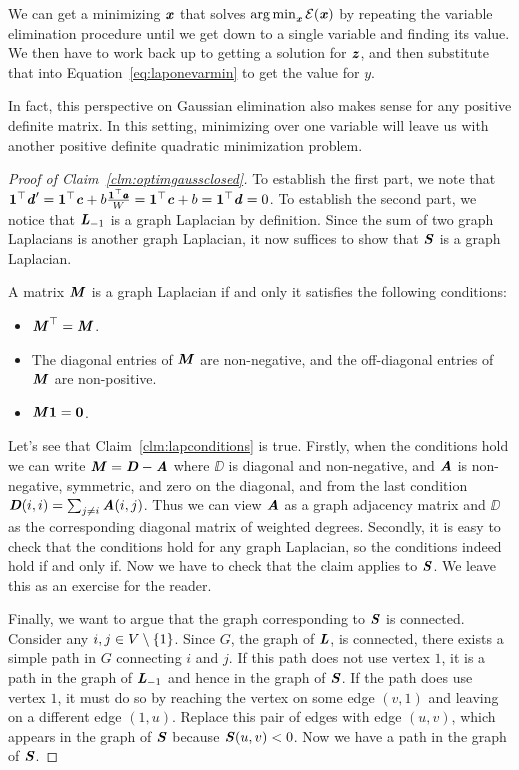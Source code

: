We can get a minimizing $\xx$ that solves $\argmin_{\xx}
    \energy(\xx)$ by repeating the variable elimination procedure until we get
down to a single variable and finding its value.
We then have to work back up to getting a solution for $\zz$, and then
substitute that into Equation~\eqref{eq:laponevarmin} to get the value
for $y$.
\begin{remark}
  In fact, this perspective on Gaussian elimination also makes sense for any
  positive definite matrix.
  In this setting, minimizing over one variable will leave us with
  another positive definite quadratic minimization problem.
\end{remark}


% 
\begin{proof}[Proof of Claim~\ref{clm:optimgaussclosed}]
To establish the first part, we note that  $\vecone^\trp \dd' = \vecone^\trp \cc + b\frac{\vecone^\trp\aa}{W} =
\vecone^\trp \cc + b= \vecone^\trp \dd = 0$.
To establish the second part, we notice that $\LL_{-1}$ is a graph
Laplacian by definition.
Since the sum of two graph Laplacians is another graph Laplacian, it
now suffices to show that $\SS $ is a graph Laplacian.
\begin{claim}
\label{clm:lapconditions}
  A matrix $\MM$ is a graph Laplacian if and only it satisfies the following conditions:
  \begin{itemize}
  \item  $\MM^\trp = \MM$.
  \item The diagonal entries of $\MM$ are non-negative, and the
    off-diagonal entries of $\MM$ are non-positive.
  \item $\MM \vecone = \veczero$.
  \end{itemize}
\end{claim}
Let's see that Claim~\ref{clm:lapconditions} is true. Firstly, when the conditions hold we
can write $\MM = \DD - \AA$ where $\DD$ is diagonal and non-negative,
and $\AA$ is non-negative, symmetric, and zero on the diagonal, and from the last condition
$\DD(i,i) = \sum_{j \neq i} \AA(i,j)$.
Thus we can view $\AA$ as a graph adjacency matrix and $\DD$ as the
corresponding diagonal matrix of weighted degrees.
Secondly, it is easy to check that the conditions hold for any graph
Laplacian, so the conditions indeed hold if and only if.
Now we have to check that the claim applies to $\SS$. We leave
this as an exercise for the reader.

Finally, we want to argue that the graph corresponding to $\SS$ is
connected.
Consider any $i,j \in V\setminus\setof{1}$.
Since $G$, the graph of $\LL$, is connected, there exists a simple path in
$G$ connecting $i$ and $j$.
If this path does not use vertex $1$, it is a path in the graph of $\LL_{-1}$
and hence in the graph of $\SS$.
If the path does use vertex $1$, it must do so by reaching the vertex
on some edge $(v,1)$ and leaving on a different edge $(1,u)$.
Replace this pair of edges with edge $(u,v)$, which appears in the graph of
$\SS$ because $\SS(u,v) < 0$. Now we have a path in the graph of $\SS$.
\end{proof}


